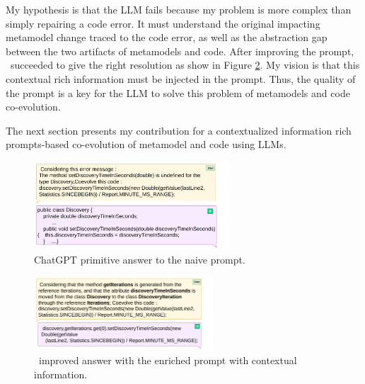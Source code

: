 My hypothesis is that the LLM fails because my problem is more complex than simply repairing a code error. It must understand the original impacting metamodel change traced to the code error, as well as the abstraction gap between the two artifacts of metamodels and code. After improving the prompt, \LLM~succeeded to give the right resolution as show in Figure \ref{fig: chatgptimprovedanswer}.
My vision is that this contextual rich information must be injected in the prompt.
Thus, the quality of the prompt is a key for the LLM to solve this problem of metamodels and code co-evolution. %

%
The next section presents my contribution for a contextualized information rich prompts-based co-evolution of metamodel and code using LLMs.  


\begin{figure}[t]
	\centering
	\includegraphics[width=0.65\textwidth]{./pics/chapter3pics/chatgptprimitiveanswer.png}
	\caption{ChatGPT primitive answer to the naive prompt.}
	\label{fig: chatgptanswer}
\end{figure}

\begin{figure}[t]
	\centering
	\includegraphics[width=0.6\textwidth]{./pics/chapter3pics/chatgptimprivedanswer.png}
	\caption{\LLM~improved answer with the enriched prompt with contextual information.}
	\label{fig: chatgptimprovedanswer}
	\vspace{-5mm}
\end{figure}
